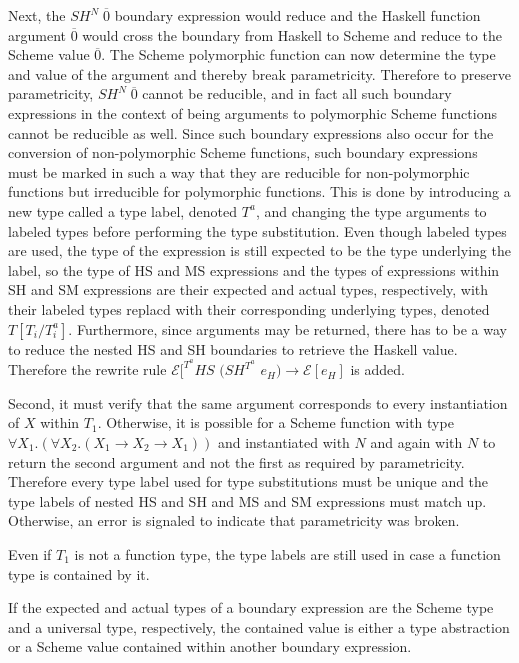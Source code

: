Next, the $SH^{N}\;\overline{0}$ boundary expression would reduce and the Haskell function argument $\overline{0}$ would cross the boundary from Haskell to Scheme and reduce to the Scheme value $\overline{0}$.  The Scheme polymorphic function can now determine the type and value of the argument and thereby break parametricity.  Therefore to preserve parametricity, $SH^{N}\;\overline{0}$ cannot be reducible, and in fact all such boundary expressions in the context of being arguments to polymorphic Scheme functions cannot be reducible as well.  Since such boundary expressions also occur for the conversion of non-polymorphic Scheme functions, such boundary expressions must be marked in such a way that they are reducible for non-polymorphic functions but irreducible for polymorphic functions.  This is done by introducing a new type called a type label, denoted $T^{a}$, and changing the type arguments to labeled types before performing the type substitution.  Even though labeled types are used, the type of the expression is still expected to be the type underlying the label, so the type of HS and MS expressions and the types of expressions within SH and SM expressions are their expected and actual types, respectively, with their labeled types replacd with their corresponding underlying types, denoted $T[T_{i}/T_{i}^{a}]$.  Furthermore, since arguments may be returned, there has to be a way to reduce the nested HS and SH boundaries to retrieve the Haskell value.  Therefore the rewrite rule $\mathscr{E}[^{T^{a}}HS$ $(SH^{T^{a}}$ $e_{H})\rightarrow\mathscr{E}[e_{H}]$ is added.

Second, it must verify that the same argument corresponds to every instantiation of $X$ within $T_{1}$.  Otherwise, it is possible for a Scheme function with type $\forall X_{1}.(\forall X_{2}.(X_{1}\rightarrow X_{2}\rightarrow X_{1}))$ and instantiated with $N$ and again with $N$ to return the second argument and not the first as required by parametricity.  Therefore every type label used for type substitutions must be unique and the type labels of nested HS and SH and MS and SM expressions must match up.  Otherwise, an error is signaled to indicate that parametricity was broken.

Even if $T_{1}$ is not a function type, the type labels are still used in case a function type is contained by it.

If the expected and actual types of a boundary expression are the Scheme type and a universal type, respectively, the contained value is either a type abstraction or a Scheme value contained within another boundary expression.

